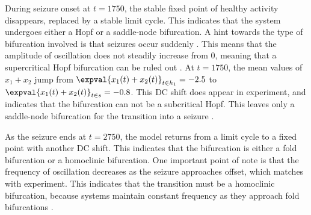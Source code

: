 During seizure onset at $t = 1750$, the stable fixed point of healthy activity disappears, replaced by a stable limit cycle.
This indicates that the system undergoes either a Hopf or a saddle-node bifurcation.
A hint towards the type of bifurcation involved is that seizures occur suddenly \cite{Kandel2013}.
This means that the amplitude of oscillation does not steadily increase from 0, meaning that a supercritical Hopf bifurcation can be ruled out \cite{Strogatz2015}.
At $t = 1750$, the mean values of $x_{1} + x_{2}$ jump from $\expval{x_{1}(t) + x_{2}(t)}_{t \in h_{1}} = -2.5$ to $\expval{x_{1}(t) + x_{2}(t)}_{t \in s} = -0.8$.
This DC shift does appear in experiment, and indicates that the bifurcation can not be a subcritical Hopf.
This leaves only a saddle-node bifurcation for the transition into a seizure \cite{Jirsa2014}.

As the seizure ends at $t = 2750$, the model returns from a limit cycle to a fixed point with another DC shift.
This indicates that the bifurcation is either a fold bifurcation or a homoclinic bifurcation.
One important point of note is that the frequency of oscillation decreases as the seizure approaches offset, which matches with experiment.
This indicates that the transition must be a homoclinic bifurcation, because systems maintain constant frequency as they approach fold bifurcations \cite{Jirsa2014}.

